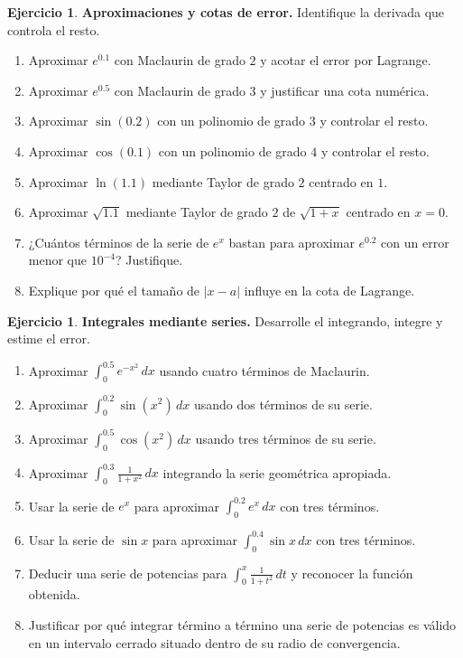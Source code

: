\documentclass[12pt]{article}
\theoremstyle{definition}
\newtheorem{Ejer}[teorema]{Ejercicio}
\theoremstyle{remark}
\newcommand{\dd}{\,dx}
\begin{document}
\begin{Ejer}\textbf{Aproximaciones y cotas de error.} Identifique la derivada que controla el resto.
\begin{enumerate}[resume=banco4]
\item Aproximar $e^{0.1}$ con Maclaurin de grado $2$ y acotar el error por Lagrange.
\item Aproximar $e^{0.5}$ con Maclaurin de grado $3$ y justificar una cota numérica.
\item Aproximar $\sin(0.2)$ con un polinomio de grado $3$ y controlar el resto.
\item Aproximar $\cos(0.1)$ con un polinomio de grado $4$ y controlar el resto.
\item Aproximar $\ln(1.1)$ mediante Taylor de grado $2$ centrado en $1$.
\item Aproximar $\sqrt{1.1}$ mediante Taylor de grado $2$ de $\sqrt{1+x}$ centrado en $x=0$.
\item ¿Cuántos términos de la serie de $e^x$ bastan para aproximar $e^{0.2}$ con un error menor que $10^{-4}$? Justifique.
\item Explique por qué el tamaño de $|x-a|$ influye en la cota de Lagrange.
\end{enumerate}
\end{Ejer}

\begin{Ejer}\textbf{Integrales mediante series.} Desarrolle el integrando, integre y estime el error.
\begin{enumerate}[resume=banco4]
\item Aproximar $\displaystyle\int_0^{0.5}e^{-x^2}\dd$ usando cuatro términos de Maclaurin.
\item Aproximar $\displaystyle\int_0^{0.2}\sin(x^2)\dd$ usando dos términos de su serie.
\item Aproximar $\displaystyle\int_0^{0.5}\cos(x^2)\dd$ usando tres términos de su serie.
\item Aproximar $\displaystyle\int_0^{0.3}\frac1{1+x^2}\dd$ integrando la serie geométrica apropiada.
\item Usar la serie de $e^x$ para aproximar $\displaystyle\int_0^{0.2}e^x\dd$ con tres términos.
\item Usar la serie de $\sin x$ para aproximar $\displaystyle\int_0^{0.4}\sin x\dd$ con tres términos.
\item Deducir una serie de potencias para $\displaystyle\int_0^x\frac1{1+t^2}\,dt$ y reconocer la función obtenida.
\item Justificar por qué integrar término a término una serie de potencias es válido en un intervalo cerrado situado dentro de su radio de convergencia.
\end{enumerate}
\end{Ejer}
\end{document}
